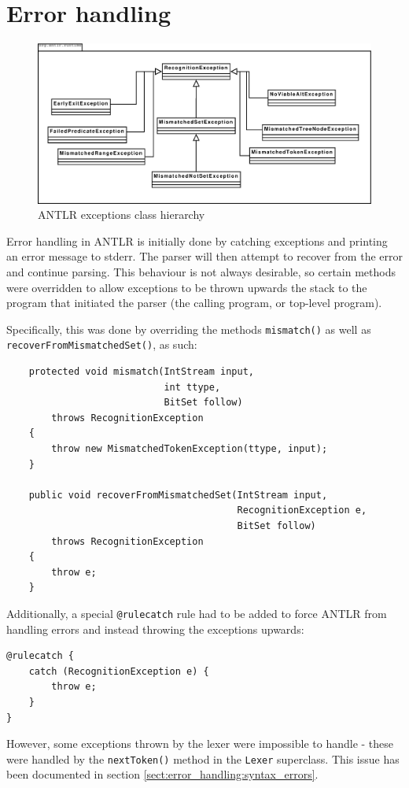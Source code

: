 \section{Error handling}
\label{sec:impl:errorhandling}
\begin{figure}[!h]
  \centering
    \includegraphics[width=1\textwidth]{diagrams/exception_uml}
  \caption{ANTLR exceptions class hierarchy}
\end{figure}
Error handling in ANTLR is initially done by catching exceptions and printing
an error message to stderr. The parser will then attempt to recover from the
error and continue parsing. This behaviour is not always desirable, so certain
methods were overridden to allow exceptions to be thrown upwards the stack to
the program that initiated the parser (the calling program, or top-level
program).

Specifically, this was done by overriding the methods \verb!mismatch()! as well as
\verb!recoverFromMismatchedSet()!, as such:

\begin{verbatim}
    protected void mismatch(IntStream input, 
                            int ttype, 
                            BitSet follow)
        throws RecognitionException
    {
        throw new MismatchedTokenException(ttype, input);
    }

    public void recoverFromMismatchedSet(IntStream input, 
                                         RecognitionException e, 
                                         BitSet follow)
        throws RecognitionException
    {
        throw e;
    }
\end{verbatim}

Additionally, a special \verb!@rulecatch! rule had to be added to force ANTLR from
handling errors and instead throwing the exceptions upwards:

\begin{verbatim}
@rulecatch {
    catch (RecognitionException e) {
        throw e;
    }
}
\end{verbatim}

However, some exceptions thrown by the lexer were impossible to handle - these
were handled by the \verb!nextToken()! method in the \verb!Lexer! superclass.
This issue has been documented in section 
\ref{sect:error_handling:syntax_errors}.
